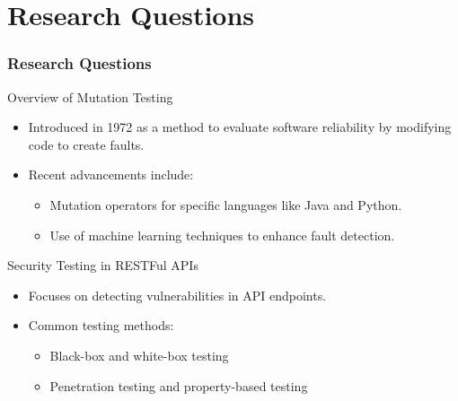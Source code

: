 \documentclass[12pt]{beamer}
\theoremstyle{remark}
\theoremstyle{definition}
\begin{document}
\section{Research Questions}


\begin{frame}[allowframebreaks]
\frametitle{Research Questions}
\begin{block}{Overview of Mutation Testing}
\begin{itemize}
    \item Introduced in 1972 as a method to evaluate software reliability by modifying code to create faults.
    \item Recent advancements include:
    \begin{itemize}
        \item Mutation operators for specific languages like Java and Python.
        \item Use of machine learning techniques to enhance fault detection.
    \end{itemize}
\end{itemize}
\end{block}

\begin{block}{Security Testing in RESTFul APIs}
\begin{itemize}
    \item Focuses on detecting vulnerabilities in API endpoints.
    \item Common testing methods:
    \begin{itemize}
        \item Black-box and white-box testing
        \item Penetration testing and property-based testing


\end{itemize}
\end{itemize}
\end{block}
\end{frame}
\end{document}

